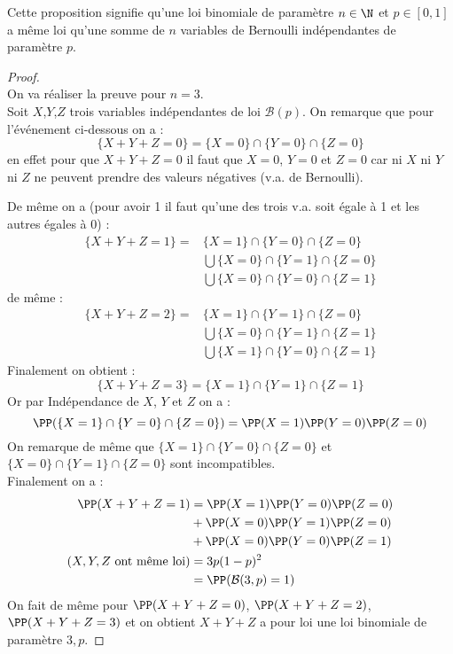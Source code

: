 \documentclass[12pt,fleqn]{report} %
\begin{document}
\begin{example}
	Cette proposition signifie qu'une loi binomiale de paramètre $n \in \N$ et $p \in [0,1]$ a même loi qu'une somme de $n$ variables de Bernoulli indépendantes de paramètre $p$. 
	
	\begin{proof}\text{ }\\
		On va réaliser la preuve pour $n = 3$. \\
		Soit $X$,$Y$,$Z$ trois variables indépendantes de loi $\mathcal{B}(p)$. On remarque que pour l'événement ci-dessous on a : \[
		\lbrace X + Y + Z = 0 \rbrace = \lbrace X = 0 \rbrace \cap \lbrace Y = 0 \rbrace \cap \lbrace Z = 0 \rbrace
		\]
		en effet pour que $X + Y + Z = 0$ il faut que $X = 0$, $Y =0$ et $Z = 0$ car ni $X$ ni $Y$ ni $Z$ ne peuvent prendre des valeurs négatives (v.a. de Bernoulli).
		
		De même on a (pour avoir 1 il faut qu'une des trois v.a. soit égale à 1 et les autres égales à 0) :
		\begin{align*}
		\lbrace X + Y + Z = 1 \rbrace =  &  \lbrace X = 1 \rbrace \cap \lbrace Y = 0 \rbrace \cap \lbrace Z = 0 \rbrace \\
		& \bigcup  \lbrace X = 0 \rbrace \cap \lbrace Y = 1 \rbrace \cap \lbrace Z = 0 \rbrace \\
		& \bigcup  \lbrace X = 0 \rbrace \cap \lbrace Y = 0 \rbrace \cap \lbrace Z = 1 \rbrace
		\end{align*}
		de même :
		\begin{align*}
		\lbrace X + Y + Z = 2 \rbrace =  &  \lbrace X = 1 \rbrace \cap \lbrace Y = 1 \rbrace \cap \lbrace Z = 0 \rbrace \\
		& \bigcup  \lbrace X = 0 \rbrace \cap \lbrace Y = 1 \rbrace \cap \lbrace Z = 1 \rbrace \\
		& \bigcup  \lbrace X = 1 \rbrace \cap \lbrace Y = 0 \rbrace \cap \lbrace Z = 1 \rbrace
		\end{align*}
		Finalement on obtient : 
		\[
		\lbrace X + Y + Z = 3 \rbrace = \lbrace X = 1 \rbrace \cap \lbrace Y = 1 \rbrace \cap \lbrace Z = 1 \rbrace
		\]
		Or par Indépendance de $X$, $Y$ et $Z$ on a :
		\[
		\PP(\lbrace X = 1 \rbrace \cap \lbrace Y = 0 \rbrace \cap \lbrace Z = 0 \rbrace) = \PP(X=1) \PP(Y = 0) \PP(Z =0)
		\]
		On remarque de même que $\lbrace X = 1 \rbrace \cap \lbrace Y = 0 \rbrace \cap \lbrace Z = 0 \rbrace$ et  $\lbrace X = 0 \rbrace \cap \lbrace Y = 1 \rbrace \cap \lbrace Z = 0 \rbrace$ sont incompatibles.\\
		Finalement on a :\begin{align*}
		\PP( X + Y + Z = 1 ) & = \PP(X=1) \PP(Y = 0) \PP(Z =0) \\ & + \PP(X=0) \PP(Y = 1) \PP(Z =0) \\&+ \PP(X=0) \PP(Y = 0) \PP(Z =1) \\ (X,Y,Z \text{ ont même loi)}& = 3 p (1 -p)^2 \\& = \PP(\mathcal{B}(3,p) = 1)
		\end{align*}
		On fait de même pour $\PP(X+Y+Z = 0)$, $\PP(X+Y+Z = 2)$,\\ $\PP(X+Y+Z = 3)$ et on obtient $X + Y + Z$ a pour loi une loi binomiale de paramètre $3,p$.
	\end{proof}
\end{example}
\end{document}
